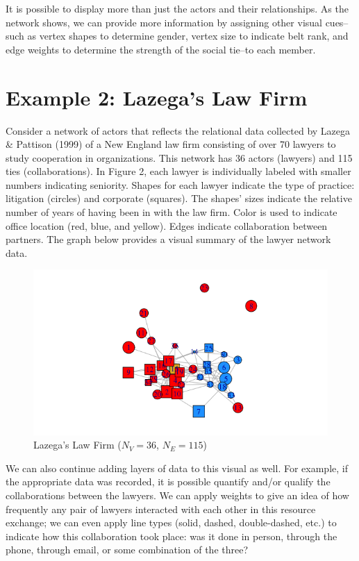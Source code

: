 \documentclass[12pt,twoside]{amherstthesis}
\begin{document}
  It is possible to display more than just the actors and their
  relationships. As the network shows, we can provide more information by
  assigning other visual cues--such as vertex shapes to determine gender,
  vertex size to indicate belt rank, and edge weights to determine the
  strength of the social tie--to each member.
  
  \section{Example 2: Lazega's Law Firm}\label{example-2-lazegas-law-firm}
  
  Consider a network of actors that reflects the relational data collected
  by Lazega \& Pattison (1999) of a New England law firm consisting of
  over 70 lawyers to study cooperation in organizations. This network has
  36 actors (lawyers) and 115 ties (collaborations). In Figure 2, each
  lawyer is individually labeled with smaller numbers indicating
  seniority. Shapes for each lawyer indicate the type of practice:
  litigation (circles) and corporate (squares). The shapes' sizes indicate
  the relative number of years of having been in with the law firm. Color
  is used to indicate office location (red, blue, and yellow). Edges
  indicate collaboration between partners. The graph below provides a
  visual summary of the lawyer network data.
  
  \begin{figure}[htbp]
  \centering
  \includegraphics{figure/02lawyerplot.png}
  \caption{Lazega's Law Firm (\(N_V = 36\), \(N_E = 115\))}
  \end{figure}
  
  We can also continue adding layers of data to this visual as well. For
  example, if the appropriate data was recorded, it is possible quantify
  and/or qualify the collaborations between the lawyers. We can apply
  weights to give an idea of how frequently any pair of lawyers interacted
  with each other in this resource exchange; we can even apply line types
  (solid, dashed, double-dashed, etc.) to indicate how this collaboration
  took place: was it done in person, through the phone, through email, or
  some combination of the three?
  
\end{document}
